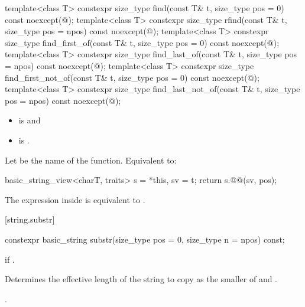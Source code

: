 %
%
%
%
%
%
\begin{itemdecl}
template<class T>
  constexpr size_type find(const T& t, size_type pos = 0) const noexcept(@\seebelow@);
template<class T>
  constexpr size_type rfind(const T& t, size_type pos = npos) const noexcept(@\seebelow@);
template<class T>
  constexpr size_type find_first_of(const T& t, size_type pos = 0) const noexcept(@\seebelow@);
template<class T>
  constexpr size_type find_last_of(const T& t, size_type pos = npos) const noexcept(@\seebelow@);
template<class T>
  constexpr size_type find_first_not_of(const T& t, size_type pos = 0) const noexcept(@\seebelow@);
template<class T>
  constexpr size_type find_last_not_of(const T& t, size_type pos = npos) const noexcept(@\seebelow@);
\end{itemdecl}

\begin{itemdescr}
\pnum
\constraints
\begin{itemize}
\item
{} is
 and
\item
{} is
.
\end{itemize}

\pnum
\effects
Let  be the name of the function.
Equivalent to:
\begin{codeblock}
basic_string_view<charT, traits> s = *this, sv = t;
return s.@@(sv, pos);
\end{codeblock}

\pnum
\remarks
The expression inside  is equivalent to
.
\end{itemdescr}

[string.substr]{}

%
\begin{itemdecl}
constexpr basic_string substr(size_type pos = 0, size_type n = npos) const;
\end{itemdecl}

\begin{itemdescr}
\pnum
\throws
{}
if
.

\pnum
\effects
Determines the effective length  of the string to copy as the smaller of  and
.

\pnum
\returns
{}.
\end{itemdescr}

